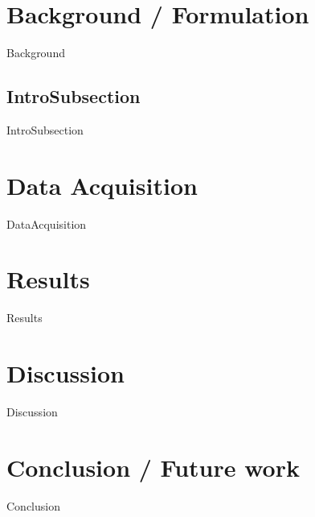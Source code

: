 \documentclass[10pt,journal,compsoc]{IEEEtran}
\begin{document}
\section{Background / Formulation}
Background

\subsection{IntroSubsection}
IntroSubsection


\section{Data Acquisition}
DataAcquisition

\section{Results}
Results

\section{Discussion}
Discussion

\section{Conclusion / Future work}
Conclusion
\end{document}
